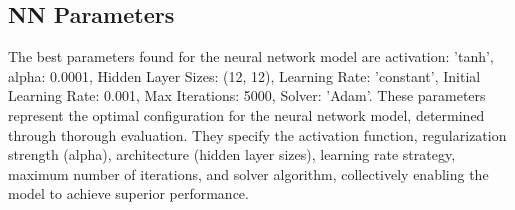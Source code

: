 \documentclass[conference]{IEEEtran}
\begin{document}
\subsection{NN Parameters}

\begin{table}[htbp]
\centering
{}
\caption{Possible Values for NN Parameters}
\label{tab:logistic-reg-params}
\end{table}

\begin{table}[htbp]
\centering
{}
\caption{NN Report}
\label{tab:svm-comparison}
\end{table}

The best parameters found for the neural network model are {activation: 'tanh', alpha: 0.0001, Hidden Layer Sizes: (12, 12), Learning Rate: 'constant', Initial Learning Rate: 0.001, Max Iterations: 5000, Solver: 'Adam'}.
These parameters represent the optimal configuration for the neural network model, determined through thorough evaluation. They specify the activation function, regularization strength (alpha), architecture (hidden layer sizes), learning rate strategy, maximum number of iterations, and solver algorithm, collectively enabling the model to achieve superior performance.
\end{document}
